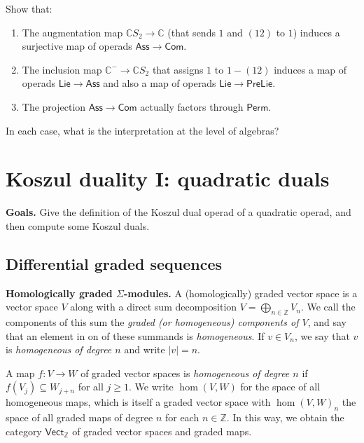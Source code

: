 \documentclass[fleqn, a4paper, twoside]{article}
\newcommand{\0}{\langle 0\rangle}
\newenvironment{tenumerate}{
 \begin{enumerate}
  \setlength{\itemsep}{0pt}
  \setlength{\parskip}{0pt}
}{\end{enumerate}}
\DeclareRobustCommand{\[}{\begin{equation}}%
\DeclareRobustCommand{\]}{\end{equation}}%
\theoremstyle{mytheorem}
\theoremstyle{introthm}
\theoremstyle{mydefinition}
\theoremstyle{mydefinition2}
\theoremstyle{plain} %
\newcommand{\?}{\,?\,}
\theoremstyle{mytheorem}
\theoremstyle{plain} %
\newcommand\blankpage{%
    \null
    \thispagestyle{empty}%
    \newpage}
\begin{document}
\begin{question}
Show that:
\begin{tenumerate}
\item The augmentation map
$\mathbb C S_2\longrightarrow \mathbb C$ (that
sends $1$ and $(12)$ to $1$) induces a surjective map of
operads $\mathsf{Ass}
\longrightarrow \mathsf{Com}$.
\item The inclusion map
$\mathbb{C}^- \longrightarrow \mathbb{C}S_2$ that assigns $1$ to 
$1-(12)$ induces a map of operads $\mathsf{Lie}\longrightarrow 
\mathsf{Ass}$ and also a map of operads $\mathsf{Lie}\longrightarrow 
\mathsf{PreLie}$.
\item The projection $\mathsf{Ass}
\longrightarrow \mathsf{Com}$ actually factors
through $\mathsf{Perm}$. 
\end{tenumerate}
In each case, what is the interpretation at the level
of algebras?
\end{question}

\afterpage{\blankpage}
\newpage

\section{Koszul duality I: quadratic duals}
\textbf{Goals.}
Give the definition of the Koszul dual
operad of a quadratic operad, and then compute
some Koszul duals.

\subsection{Differential graded sequences}


\textbf{Homologically graded $\Sigma$-modules.}
A (homologically) graded vector space is a
vector space $V$ along with a direct sum
decomposition $V = \bigoplus_{n\in\mathbb Z} V_n$.
We call the components of this sum the \emph{graded (or
homogeneous)
components of $V$}, and say that an element in 
on of these summands is \emph{homogeneous}. If
$v\in V_n$, we say that $v$ is \emph{homogeneous of
degree $n$} and write $|v|=n$. 

A map $f : V\longrightarrow W$ of graded vector spaces
is \emph{homogeneous of degree $n$} if $f(V_j)\subseteq W_{j+n}$ for
all $j\geqslant 1$. We write $\hom(V,W)$ for the
space of all homogeneous maps, which is itself a graded
vector space with $\hom(V,W)_n$ the space of all
graded maps of degree $n$ for each $n\in\mathbb Z$. 
In this way, we obtain the category $\mathsf{Vect}_\mathbb{Z}$
of graded vector spaces and graded maps. 
\end{document}
